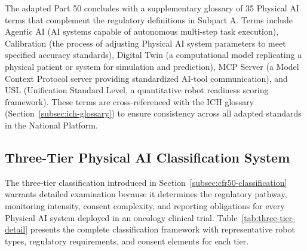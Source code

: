 The adapted Part 50 concludes with a supplementary glossary of 35 Physical AI
terms that complement the regulatory definitions in Subpart A. Terms include
Agentic AI (AI systems capable of autonomous multi-step task execution),
Calibration (the process of adjusting Physical AI system parameters to meet
specified accuracy standards), Digital Twin (a computational model replicating a
physical patient or system for simulation and prediction), MCP Server (a Model
Context Protocol server providing standardized AI-tool communication), and USL
(Unification Standard Level, a quantitative robot readiness scoring framework).
These terms are cross-referenced with the ICH glossary
(Section~\ref{subsec:ich-glossary}) to ensure consistency across all adapted
standards in the National Platform.

\subsection{Three-Tier Physical AI Classification System}
\label{subsec:cfr50-three-tier}

The three-tier classification introduced in
Section~\ref{subsec:cfr50-classification} warrants detailed examination because
it determines the regulatory pathway, monitoring intensity, consent complexity,
and reporting obligations for every Physical AI system deployed in an oncology
clinical trial. Table~\ref{tab:three-tier-detail} presents the complete
classification framework with representative robot types, regulatory
requirements, and consent elements for each tier.


